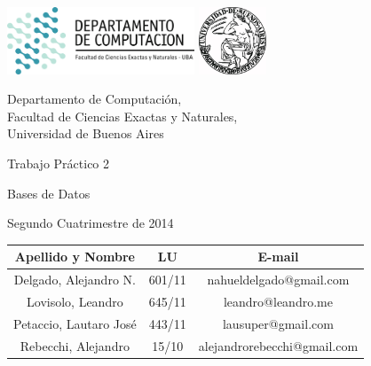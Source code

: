 \documentclass[a4paper, 10pt, twoside]{article}
\newcommand{\titulo}{Trabajo Práctico 2}
\newcommand{\materia}{Bases de Datos}
\newcommand{\cuatrimestre}{Segundo Cuatrimestre de 2014}
\begin{document}


\thispagestyle{caratula}

\begin{center}

\includegraphics[height=2cm]{DC.png} 
\hfill
\includegraphics[height=2cm]{UBA.jpg} 

\vspace{2cm}

Departamento de Computación,\\
Facultad de Ciencias Exactas y Naturales,\\
Universidad de Buenos Aires

\vspace{4cm}

\begin{Huge}
\titulo
\end{Huge}

\vspace{0.5cm}

\begin{Large}
\materia
\end{Large}

\vspace{1cm}

\cuatrimestre

\vspace{4cm}

\begin{tabular}{|c|c|c|}
\hline
Apellido y Nombre & LU & E-mail\\
\hline
Delgado, Alejandro N.  & 601/11 & nahueldelgado@gmail.com\\
Lovisolo, Leandro      & 645/11 & leandro@leandro.me\\
Petaccio, Lautaro José & 443/11 & lausuper@gmail.com\\
Rebecchi, Alejandro    & 15/10  & alejandrorebecchi@gmail.com\\
\hline
\end{tabular}

\end{center}
\end{document}
